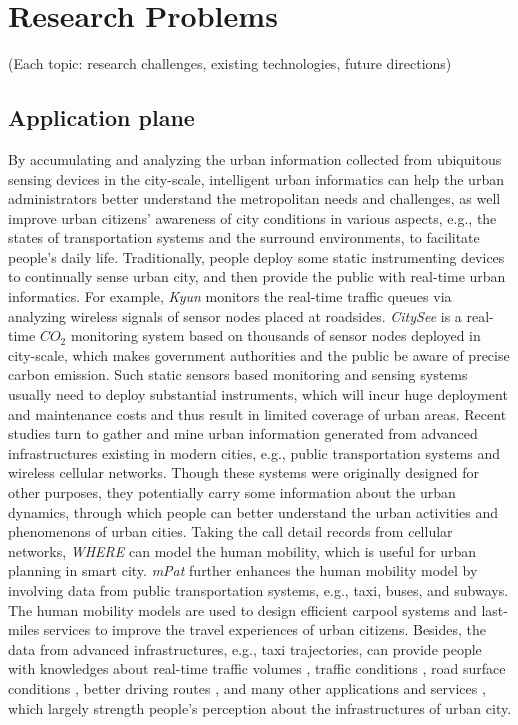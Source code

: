 
\section{Research Problems}

(Each topic: research challenges, existing technologies, future directions)

\subsection{Application plane} 

By accumulating and analyzing the urban information collected from ubiquitous sensing devices in the city-scale, intelligent urban informatics can help the urban administrators better understand the metropolitan needs and challenges, as well improve urban citizens' awareness of city conditions in various aspects, e.g., the states of transportation systems and the surround environments, to facilitate people's daily life. Traditionally, people deploy some static instrumenting devices to continually sense urban city, and then provide the public with real-time urban informatics. For example, \textit{Kyun} \cite{kyunqueue} monitors the real-time traffic queues via analyzing wireless signals of sensor nodes placed at roadsides. \textit{CitySee} \cite{citysee} is a real-time $CO_2$ monitoring system based on thousands of sensor nodes deployed in city-scale, which makes government authorities and the public be aware of precise carbon emission. Such static sensors based monitoring and sensing systems usually need to deploy substantial instruments, which will incur huge deployment and maintenance costs and thus result in limited coverage of urban areas. Recent studies turn to gather and mine urban information generated from advanced infrastructures existing in modern cities, e.g., public transportation systems and wireless cellular networks. Though these systems were originally designed for other purposes, they potentially carry some information about the urban dynamics, through which people can better understand the urban activities and phenomenons of urban cities. Taking the call detail records from cellular networks, \textit{WHERE} \cite{humanmobility} can model the human mobility, which is useful for urban planning in smart city. \textit{mPat} \cite{multisource} further enhances the human mobility model by involving data from public transportation systems, e.g., taxi, buses, and subways. The human mobility models are used to design efficient carpool systems \cite{coride} and last-miles services \cite{feeder} to improve the travel experiences of urban citizens. Besides, the data from advanced infrastructures, e.g., taxi trajectories, can provide people with knowledges about real-time traffic volumes \cite{roving}, traffic conditions \cite{compressive}\cite{travelcost}, road surface conditions \cite{pothole}, better driving routes \cite{driving}, and many other applications and services \cite{trajectory}, which largely strength people's perception about the infrastructures of urban city. 

